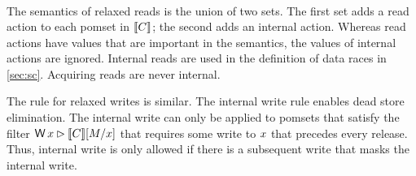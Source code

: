 \begin{align*}
\end{align*}

The semantics of relaxed reads is the union of two sets.  The first set adds
a read action to each pomset in $\llbracket C\rrbracket$; the second adds an internal
action.  Whereas read actions have values that are important in the
semantics, the values of internal actions are ignored.  Internal reads are used in the definition of data races in \textsection\ref{sec:sc}.
Acquiring reads are never internal.

The rule for relaxed writes is similar. The internal write rule enables dead store elimination.  The internal write can only be applied to pomsets that satisfy the filter $\DW{\aLoc}{}\guard\sem{\aCmd}[\aExp/\aLoc]$ that  requires some write to $x$ that precedes every release.  Thus, internal write is only allowed if there is a subsequent write that masks the internal write. 

